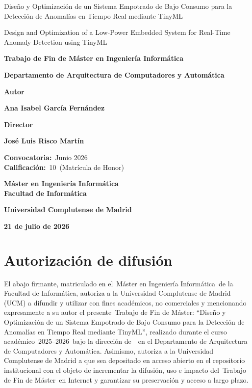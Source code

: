 \documentclass[11pt,a4paper]{book}
\newcommand{\miAutor}{Ana Isabel García Fernández}
\newcommand{\miDirector}{José Luis Risco Martín}
\newcommand{\miTituloES}{Diseño y Optimización de un Sistema Empotrado de Bajo Consumo para la Detección de Anomalías en Tiempo Real mediante TinyML}
\newcommand{\miTituloEN}{Design and Optimization of a Low-Power Embedded System for Real-Time Anomaly Detection using TinyML}
\newcommand{\miTFX}{Trabajo de Fin de Máster}
\newcommand{\miCurso}{2025--2026}
\newcommand{\misEstudios}{Máster en Ingeniería Informática}
\newcommand{\miTFXyEstudios}{Trabajo de Fin de Máster en Ingeniería Informática}
\newcommand{\miDepartamento}{Departamento de Arquitectura de Computadores y Automática}
\newcommand{\miConvocatoria}{Junio 2026}
\newcommand{\miNota}{10}
\newcommand{\miCalificacion}{Matrícula de Honor}
\newcommand{\miFecha}{21 de julio de 2026}
\begin{document}
\cleardoublepage
\thispagestyle{empty}
\begin{center}
\vspace*{1cm}

{\Huge {\miTituloES}} \\
{\Huge {\miTituloEN} \par}

\vspace*{2.5cm}

{\large \textbf{\miTFXyEstudios}} \\
{\large \textbf{\miDepartamento} \par}

\vspace{1cm}

{\Large \textbf{Autor}} \\
{\large \textbf{\miAutor} \par}

\vspace{0.50cm}

{\Large \textbf{Director}} \\
{\large \textbf{\miDirector} \par}

\vspace{0.75cm}\vfill

{\large \textbf{Convocatoria:}~\miConvocatoria}\\
{\large \textbf{Calificación:}~\miNota~(\miCalificacion)}

\vspace{1.00cm}\vfill

{\large \textbf{\misEstudios}}\\
{\large \textbf{Facultad de Informática}}\\
{\large \textbf{Universidad Complutense de Madrid} \par}
{\large \textbf{\miFecha}}
\end{center}

\chapter*{Autorización de difusión}
El abajo firmante, matriculado en el~\misEstudios~de la Facultad de Informática, autoriza a la Universidad Complutense de Madrid (UCM) a difundir y utilizar con fines académicos, no comerciales y mencionando expresamente a su autor el presente~\miTFX: ``\miTituloES'', realizado durante el curso académico~\miCurso~bajo la dirección de~\miDirectorInline~en el \miDepartamento. Asimismo, autoriza a la Universidad Complutense de Madrid a que sea depositado en acceso abierto en el repositorio institucional con el objeto de incrementar la difusión, uso e impacto del~\miTFX~en Internet y garantizar su preservación y acceso a largo plazo.
\end{document}
